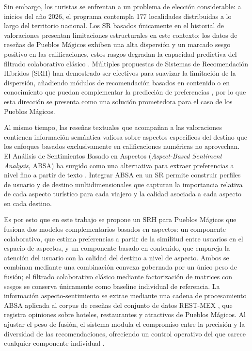 Sin embargo, los turistas se enfrentan a un problema de elección considerable: a inicios del año 2026, el programa contempla 177 localidades distribuidas a lo largo del territorio nacional. Los SR basados únicamente en el historial de valoraciones presentan limitaciones estructurales en este contexto: los datos de reseñas de Pueblos Mágicos exhiben una alta dispersión y un marcado sesgo positivo en las calificaciones, estos rasgos degradan la capacidad predictiva del filtrado colaborativo clásico \citep{koren_matrix_2009}. Múltiples propuestas de Sistemas de Recomendación Híbridos (SRH) han demostrado ser efectivos para suavizar la limitación de la dispersión, añadiendo módulos de recomendación basados en contenido o en conocimiento que puedan complementar la predicción de preferencias \citep{Hossain_Sikder_Andreou_2025}, por lo que esta dirección se presenta como una solución prometedora para el caso de los Pueblos Mágicos.

Al mismo tiempo, las reseñas textuales que acompañan a las valoraciones contienen información semántica valiosa sobre aspectos específicos del destino que los enfoques basados exclusivamente en calificaciones numéricas no aprovechan. El Análisis de Sentimientos Basado en Aspectos (\textit{Aspect-Based Sentiment Analysis}, ABSA) ha surgido como una alternativa para extraer preferencias a nivel fino a partir de texto \citep{zhang_survey_2023}. Integrar ABSA en un SR permite construir perfiles de usuario y de destino multidimensionales que capturan la importancia relativa de cada aspecto turístico para cada viajero y la calidad asociada a cada aspecto en cada destino.


Es por esto que en este trabajo se propone un SRH para Pueblos Mágicos que fusiona dos modelos complementarios basados en aspectos: un componente colaborativo, que estima preferencias a partir de la similitud entre usuarios en el espacio de aspectos, y un componente basado en contenido, que empareja la atención del usuario con la calidad del destino a nivel de aspecto. Ambos se combinan mediante una combinación convexa gobernada por un único peso de fusión; el filtrado colaborativo clásico mediante factorización de matrices con sesgos \citep{koren_matrix_2009} se conserva únicamente como baseline individual de referencia. La información aspecto-sentimiento se extrae mediante una cadena de procesamiento ABSA aplicada al corpus de reseñas del conjunto de datos REST-MEX \citep{alvarez-carmona_overview_2021}, que registra opiniones sobre hoteles, restaurantes y atractivos de Pueblos Mágicos. Al ajustar el peso de fusión, el sistema modula el compromiso entre la precisión y la diversidad de las recomendaciones, ofreciendo un control operativo del que carece cualquier componente individual \citep{burke_hybrid_2002}.

